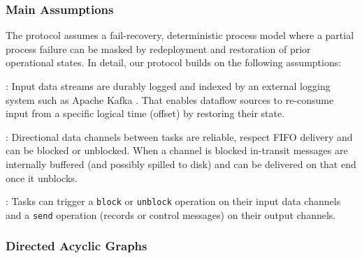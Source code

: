\subsubsection{Main Assumptions}

The protocol assumes a fail-recovery, deterministic process model \cite{elnozahy2002survey} where a partial process failure can be masked by redeployment and restoration of prior operational states. In detail, our protocol builds on the following assumptions:

: Input data streams are durably logged and indexed by an external logging system such as Apache Kafka \cite{kreps2011kafka}. That enables dataflow sources to re-consume input from a specific logical time (offset) by restoring their state. 

: Directional data channels between tasks are reliable, respect FIFO delivery and can be blocked or unblocked. When a channel is blocked in-transit messages are internally buffered (and possibly spilled to disk) and can be delivered on that end once it unblocks.

: 
Tasks can trigger a \texttt{block} or \texttt{unblock} operation on their input data channels and a \texttt{send} operation (records or control messages) on their output channels.


\subsubsection{Directed Acyclic Graphs}

